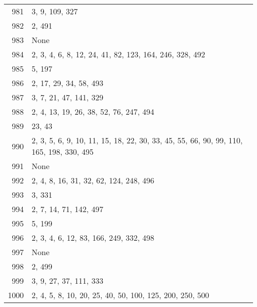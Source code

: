\documentclass[12pt]{article}
\begin{document}
\begin{tabular}{|r|l|}
981 & 3, 9, 109, 327 \\ 
982 & 2, 491 \\ 
983 & None \\ 
984 & 2, 3, 4, 6, 8, 12, 24, 41, 82, 123, 164, 246, 328, 492 \\ 
985 & 5, 197 \\ 
986 & 2, 17, 29, 34,  58, 493 \\ 
987 & 3, 7, 21, 47, 141, 329 \\ 
988 & 2, 4, 13, 19, 26, 38, 52, 76, 247, 494 \\ 
989 & 23, 43 \\ 
990 & 2, 3, 5, 6, 9, 10, 11, 15, 18, 22, 30, 33, 45, 55, 66, 90, 99, 110, 165, 198, 330, 495 \\ 
991 & None \\ 
992 & 2, 4, 8, 16, 31, 32,  62, 124, 248, 496 \\ 
993 & 3, 331 \\ 
994 & 2, 7, 14, 71, 142, 497 \\ 
995 & 5, 199 \\ 
996 & 2, 3, 4, 6, 12, 83, 166, 249, 332, 498 \\ 
997 & None \\ 
998 & 2, 499 \\ 
999 & 3, 9, 27, 37, 111, 333 \\ 
1000 & 2, 4, 5, 8, 10, 20, 25, 40, 50, 100, 125, 200, 250, 500 \\
\end{tabular}
\end{document}
